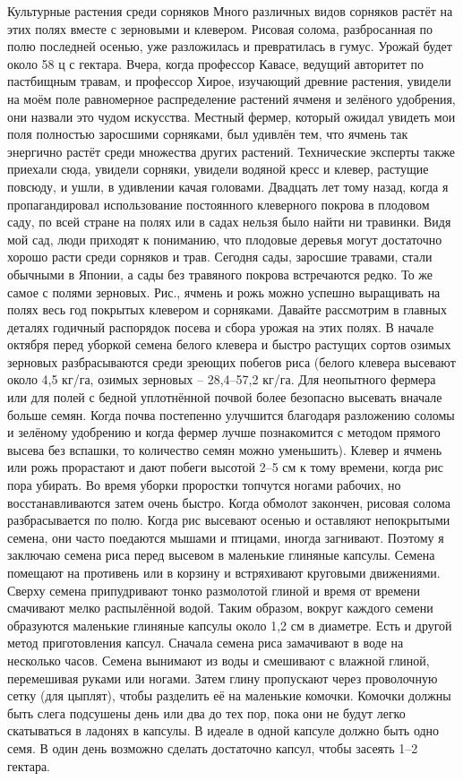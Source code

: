 \documentclass[a4paper]{book}
\begin{document}
Культурные растения среди сорняков
Много различных видов сорняков растёт на этих полях вместе с зерновыми и клевером.
Рисовая солома, разбросанная по полю последней осенью, уже разложилась и превратилась
в гумус. Урожай будет около 58 ц с гектара.
Вчера, когда профессор Кавасе, ведущий авторитет по пастбищным травам, и профессор
Хирое, изучающий древние растения, увидели на моём поле равномерное распределение
растений ячменя и зелёного удобрения, они назвали это чудом искусства. Местный фермер,
который ожидал увидеть мои поля полностью заросшими сорняками, был удивлён тем, что
ячмень так энергично растёт среди множества других растений. Технические эксперты
также приехали сюда, увидели сорняки, увидели водяной кресс и клевер, растущие повсюду,
и ушли, в удивлении качая головами.
Двадцать лет тому назад, когда я пропагандировал использование постоянного
клеверного покрова в плодовом саду, по всей стране на полях или в садах нельзя было найти
ни травинки. Видя мой сад, люди приходят к пониманию, что плодовые деревья могут
достаточно хорошо расти среди сорняков и трав. Сегодня сады, заросшие травами, стали
обычными в Японии, а сады без травяного покрова встречаются редко.
То же самое с полями зерновых. Рис., ячмень и рожь можно успешно выращивать на
полях весь год покрытых клевером и сорняками.
Давайте рассмотрим в главных деталях годичный распорядок посева и сбора урожая на
этих полях. В начале октября перед уборкой семена белого клевера и быстро растущих сортов
озимых зерновых разбрасываются среди зреющих побегов риса (белого клевера высевают
около 4,5 кг/га, озимых зерновых – 28,4–57,2 кг/га. Для неопытного фермера или для полей с
бедной уплотнённой почвой более безопасно высевать вначале больше семян. Когда почва
постепенно улучшится благодаря разложению соломы и зелёному удобрению и когда фермер
лучше познакомится с методом прямого высева без вспашки, то количество семян можно
уменьшить). Клевер и ячмень или рожь прорастают и дают побеги высотой 2–5 см к тому
времени, когда рис пора убирать. Во время уборки проростки топчутся ногами рабочих, но
восстанавливаются затем очень быстро. Когда обмолот закончен, рисовая солома
разбрасывается по полю.
Когда рис высевают осенью и оставляют непокрытыми семена, они часто поедаются
мышами и птицами, иногда загнивают. Поэтому я заключаю семена риса перед высевом в
маленькие глиняные капсулы.
Семена помещают на противень или в корзину и встряхивают круговыми движениями.
Сверху семена припудривают тонко размолотой глиной и время от времени смачивают мелко
распылённой водой. Таким образом, вокруг каждого семени образуются маленькие глиняные
капсулы около 1,2 см в диаметре.
Есть и другой метод приготовления капсул. Сначала семена риса замачивают в воде на
несколько часов. Семена вынимают из воды и смешивают с влажной глиной, перемешивая
руками или ногами. Затем глину пропускают через проволочную сетку (для цыплят), чтобы
разделить её на маленькие комочки. Комочки должны быть слега подсушены день или два до
тех пор, пока они не будут легко скатываться в ладонях в капсулы. В идеале в одной капсуле
должно быть одно семя. В один день возможно сделать достаточно капсул, чтобы засеять 1–2
гектара.
\end{document}
